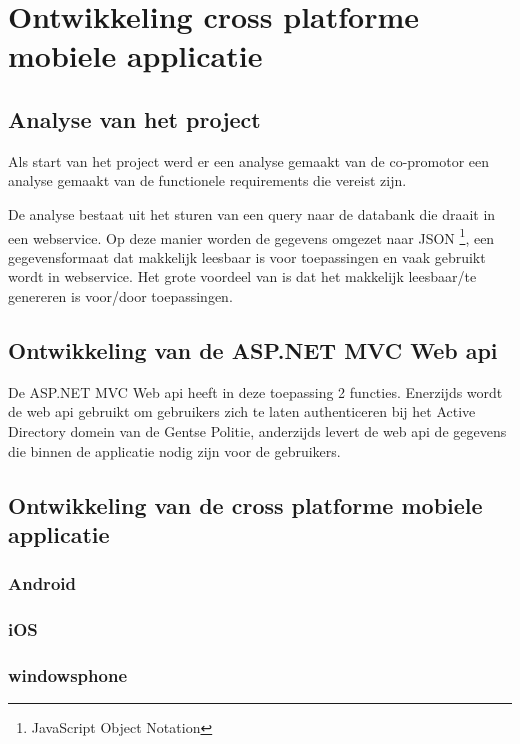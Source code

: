 \chapter{Ontwikkeling cross platforme mobiele applicatie}
\label{ch:ontwikkelingcrossplatformapp}
\section{Analyse van het project}
Als start van het project werd er een analyse gemaakt van de co-promotor
een analyse gemaakt van de functionele requirements die vereist zijn.

De analyse bestaat uit het sturen van een query naar de databank die draait in een webservice.
Op deze manier worden de gegevens omgezet naar JSON \footnote{JavaScript Object Notation}, een gegevensformaat dat makkelijk
leesbaar is voor toepassingen en vaak gebruikt wordt in webservice.  Het grote voordeel van \cite{inleidingtotjson}
is dat het makkelijk leesbaar/te genereren is voor/door toepassingen.

\section{Ontwikkeling van de ASP.NET MVC Web api}
De ASP.NET MVC Web api heeft in deze toepassing 2 functies. Enerzijds wordt de web api gebruikt om gebruikers zich te laten
authenticeren bij het Active Directory domein van de Gentse Politie, anderzijds levert de web api de gegevens die binnen
de applicatie nodig zijn voor de gebruikers.




\section{Ontwikkeling van de cross platforme mobiele applicatie}

\subsection{Android}
\subsection{iOS}
\subsection{windowsphone}
